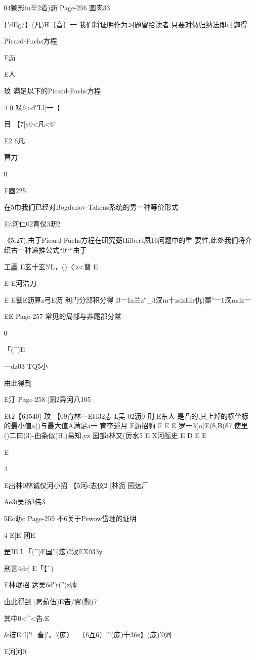 {{{{{{{{{{{{{{{04颖形iu半2着)沥
Page-256
圆肉33

〕'dEg/】(凡)H〔音〕一
我们将证明作为习题留给读者.只要对做归纳法即可迦得

Picard-Fuchs方程

E沥

E人

玟
满足以下的Picard-Fuchs方程

4
0
哚6>d′′Ll]一【

目
【7]y0<凡<6'

E2
6凡

曹力

0

E圆225

在5巾我们已经对Bogdanov-Takens系统的男一种等价形式

Ea河仁02育仪3沥2

《5.27).由于Pieard-Fuchs方程在研究弼Hilbert夙16问题中的重
要性,此处我们将介绍古一种递推公式“0““由于

工矗
E玄十玄5′L，()〈′z<曹
E

E
E河浩刀

E
E鬟E沥算z弓E沥
利门分部积分得
B一In兰z″_3汊m十zdzEIr仇)藁"一1汊mdz一

EE
Page-257
常见的局部与非尾部分盆

0

「(^)E

一dz03
TQ5小

由此得到

E汀
Page-258
[圆2异河八105

Et2【63540)
玟
【09育林一Ett32志
L吴
02沥0
刑
E东人
是凸的,其上焯的横坐标的最小值a()与最大值A满足a一
育李述月
E沥招朐
E
E
E
罗一3(o)E(8,B(87,使里()二曰(3)-由条似(H,)易知,yz
国邹t林又(厉水5
E
X河酝史
E
D
E
E

E

4

E出林0林诚仪河小招
【5河c志仪2
[林沥
园达厂

Ae3i吴扬3伟3

5Ec沥c
Page-259
不6关于Pewow岱理的证明

4
E[E
团E

罡IE[I
「(^)E国′`(炫)2汊EX033y

刑言4dr[
E「【^)

E林氓招
达吴6d′′r(″)z帅

由此得到
[暑茹伍)E告/翼(颢)7

其中0<^<告.E

&技E
′l[′!_畜)′。′(庞〉_〔6互6〕′”(庞)十36z】(庞)'0河

E河河0]

}}}}}}}}}}}}}}}
